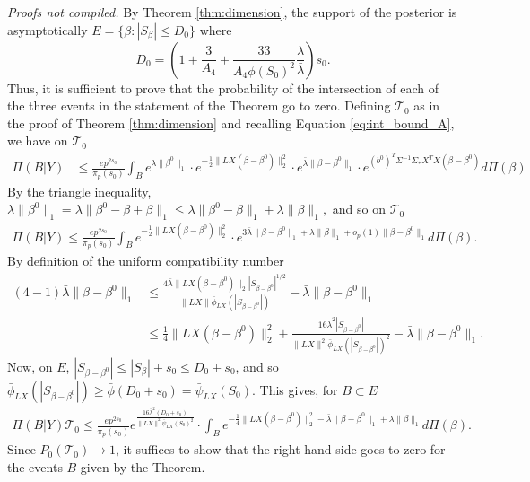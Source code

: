 \documentclass[11pt]{article}
\renewenvironment{proof}[1]{\par\noindent{\bf #1 \ }}{\hfill\BlackBox\\[2mm]}
\renewenvironment{proof}[1]{\textit{Proofs not compiled.}}{}
\newcommand{\bezero}{\beta^0}
\newcommand{\postCov}{\Sigma_*}
\numberwithin{equation}{section}
\begin{document}
\begin{proof}{Proof of Theorem \ref{thm:recovery}.}
By Theorem \ref{thm:dimension}, the support of the posterior is asymptotically
$
E = \{\beta : |S_\beta| \leq D_0 \}
$
where
$$
D_0 = \left(1 + \frac{3}{A_4} + \frac{33}{A_4 \phi(S_0)^2}\frac{\lambda}{\bar{\lambda}}\right)s_0.
$$
Thus, it is sufficient to prove that the probability of the intersection of each of the three events in the statement of the Theorem go to zero.
Defining $\mathcal{T}_0$ as in the proof of Theorem \ref{thm:dimension} and recalling Equation \eqref{eq:int_bound_A}, we have on $\mathcal{T}_0$
\begin{align*}
	\Pi(B | Y) &\leq \frac{e p^{2s_0}}{\pi_p(s_0)} \int_B e^{\lambda\|\beta^0\|_1} \cdot e^{-\frac{1}{2}\|LX(\beta - \bezero)\|_2^2} 
\cdot  e^{\bar{\lambda}\|\beta - \bezero\|_1} \cdot e^{(b^0)^T\Sigma^{-1}\postCov  X^TX (\beta - \bezero)} d\Pi(\beta) 
\end{align*}
By the triangle inequality, 
$
\lambda\|\bezero\|_1 = \lambda\|\bezero - \beta + \beta\|_1 \leq \lambda\|\bezero - \beta\|_1 + \lambda\|\beta\|_1,
$
and so on $\mathcal{T}_0$
\begin{align*}
		\Pi(B | Y) \leq 	\frac{e p^{2s_0}}{\pi_p(s_0)} \int_B  e^{-\frac{1}{2}\|LX(\beta - \bezero)\|_2^2} 
\cdot  e^{3\bar{\lambda}\|\beta - \bezero\|_1 + \lambda\|\beta\|_1 + o_p(1)\|\beta - \bezero\|_1} d\Pi(\beta).
\end{align*}
By definition of the uniform compatibility number
\begin{align}
(4 - 1)\bar{\lambda}\|\beta - \bezero\|_1 &\leq \frac{4\bar{\lambda} \|LX(\beta - \bezero)\|_2|S_{\beta-\bezero}|^{1/2}}{\|LX\| \bar{\phi}_{LX}(|S_{\beta - \bezero}|)} - \bar{\lambda}\|\beta - \bezero\|_1 \nonumber\\
&\leq \frac{1}{4}\|LX(\beta - \bezero)\|_2^2 + \frac{16\bar{\lambda}^2 |S_{\beta - \bezero}|}{\|LX\|^2 \bar{\phi}_{LX}(|S_{\beta - \bezero}|)^2} - \bar{\lambda}\|\beta - \bezero\|_1. \label{eq:lambda_beta_beta_0}
\end{align}
Now, on $E$, $|S_{\beta - \bezero}| \leq |S_\beta| + s_0 \leq D_0 + s_0$, and so $\bar{\phi}_{LX}(|S_{\beta - \bezero}|) \geq \bar{\phi}(D_0 + s_0) = \bar{\psi}_{LX}(S_0)$. This gives, for $B \subset E$
\begin{align*}
	\Pi(B | Y)\mathcal{T}_0 \leq \frac{e p^{2s_0}}{\pi_p(s_0)}e^{\frac{16\bar{\lambda}^2(D_0 + s_0)}{\|LX\|^2\bar{\psi}_{LX}(S_0)^2}} \cdot \int_B e^{-\frac{1}{4} \|LX(\beta - \bezero)\|_2^2 -\bar{\lambda}\|\beta - \bezero\|_1 + \lambda\|\beta\|_1}d\Pi(\beta). 
\end{align*}
Since $P_0(\mathcal{T}_0) \rightarrow 1$, it suffices to show that the right hand side goes to zero for the events $B$ given by the Theorem.


\end{proof}
\end{document}
